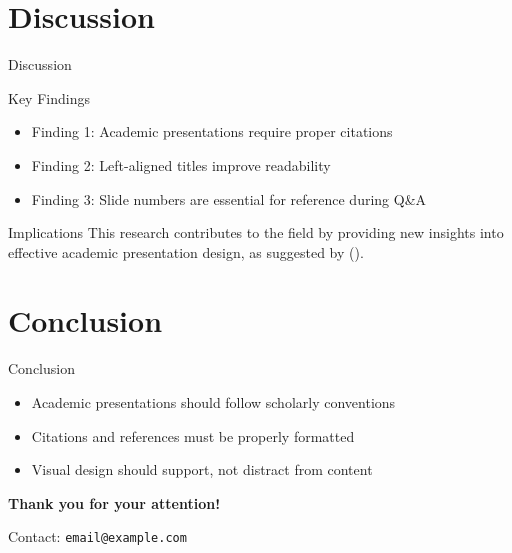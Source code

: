 \documentclass[aspectratio=169]{beamer}
\begin{document}
\section{Discussion}

\begin{frame}{Discussion}
  \begin{alertblock}{Key Findings}
    \begin{itemize}
      \item Finding 1: Academic presentations require proper citations \cite{Smith2020}
      \item Finding 2: Left-aligned titles improve readability \cite{Johnson2019}
      \item Finding 3: Slide numbers are essential for reference during Q\&A
    \end{itemize}
  \end{alertblock}
  
  \begin{block}{Implications}
    This research contributes to the field by providing new insights into effective academic presentation design, as suggested by \citeauthor{Garcia2021} (\citeyear{Garcia2021}).
  \end{block}
\end{frame}

\section{Conclusion}

\begin{frame}{Conclusion}
  \begin{itemize}
    \item Academic presentations should follow scholarly conventions
    \item Citations and references must be properly formatted
    \item Visual design should support, not distract from content
  \end{itemize}
  
  \vspace{1cm}
  
  \begin{center}
    \large\textbf{Thank you for your attention!}
    
    \vspace{0.5cm}
    
    \normalsize
    Contact: \texttt{email@example.com}
  \end{center}
\end{frame}
\end{document}
